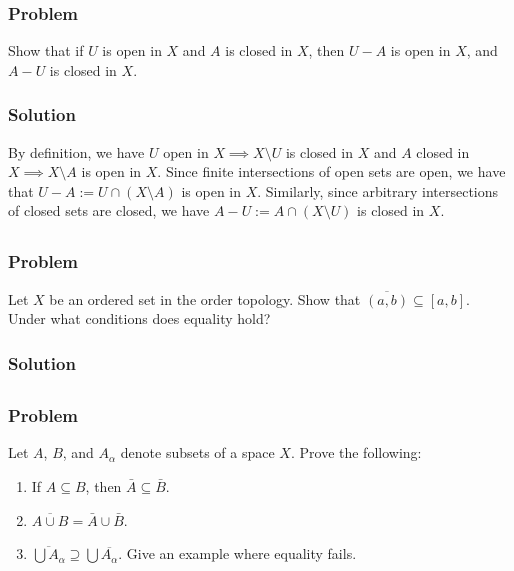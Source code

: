\subsubsection{Problem}
Show that if $U$ is open in $X$ and $A$ is closed in $X$, then $U-A$ is open in $X$, and $A-U$ is closed in $X$.
\subsubsection{Solution}
By definition, we have $U$ open in $X \implies X\setminus U$ is closed in $X$ and $A$ closed in $X \implies X\setminus A$ is open in $X$. Since finite intersections of open sets are open, we have that $U-A := U \cap (X\setminus A)$ is open in $X$. Similarly, since arbitrary intersections of closed sets are closed, we have $A-U := A \cap (X\setminus U)$ is closed in $X$.


\subsection{}

\subsubsection{Problem}
Let $X$ be an ordered set in the order topology. Show that $\overline{(a, b)} \subseteq [a, b]$. Under what conditions does equality hold?
\subsubsection{Solution}
\todo


\subsection{}

\subsubsection{Problem}
Let $A$, $B$, and $A_\alpha$ denote subsets of a space $X$. Prove the following:
\begin{enumerate}
 \item If $A \subseteq B$, then $\bar{A} \subseteq \bar{B}$.
 \item $\overline{A \cup B} = \bar A \cup \bar B$.
 \item $\overline{\bigcup A_\alpha} \supseteq \bigcup \overline{A_\alpha}$. Give an example where equality fails.
\end{enumerate}

